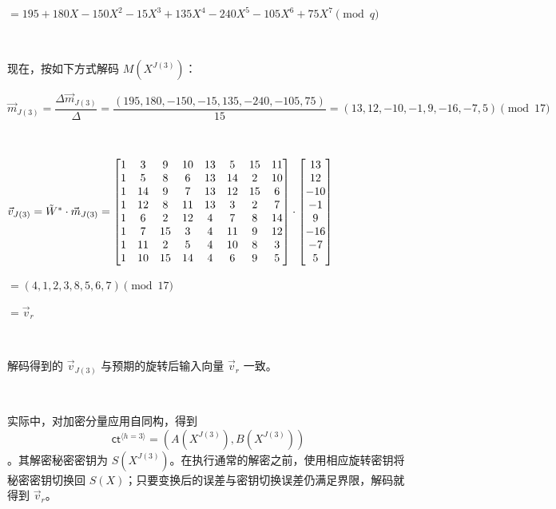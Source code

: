 $= 195 + 180X - 150X^2 - 15X^3 + 135X^4 - 240X^5 - 105X^6 + 75X^7 \pmod{q}$

$ $




现在，按如下方式解码 $M(X^{J(3)})$：

$\vec{m}_{J(3)} = \dfrac{\Delta \vec{m}_{J(3)}}{\Delta} = \dfrac{(195, 180, -150, -15, 135, -240, -105, 75)}{15} = (13, 12, -10, -1, 9, -16, -7, 5) \pmod{17}$

$ $


$\vec{v}_{J(3)} = \tilde{W}^* \cdot \vec{m}_{J(3)} = \begin{bmatrix}
1&3&9&10&13&5&15&11\\
1&5&8&6&13&14&2&10\\
1&14&9&7&13&12&15&6\\
1&12&8&11&13&3&2&7\\
1&6&2&12&4&7&8&14\\
1&7&15&3&4&11&9&12\\
1&11&2&5&4&10&8&3\\
1&10&15&14&4&6&9&5\\
\end{bmatrix} \cdot \begin{bmatrix}
13\\
12\\
-10\\
-1\\
9\\
-16\\
-7\\
5\end{bmatrix}$

$= (4, 1, 2, 3, 8, 5, 6, 7) \pmod{17}$

$= \vec{v}_r$

$ $

解码得到的 $\vec{v}_{J(3)}$ 与预期的旋转后输入向量 $\vec{v}_r$ 一致。


$ $

实际中，对加密分量应用自同构，得到
\[
\textsf{ct}^{\langle h=3\rangle}=(A(X^{J(3)}),B(X^{J(3)}))
\]
。其解密秘密密钥为 $S(X^{J(3)})$。在执行通常的解密之前，使用相应旋转密钥将秘密密钥切换回 $S(X)$；只要变换后的误差与密钥切换误差仍满足界限，解码就得到 $\vec v_r$。

$ $




